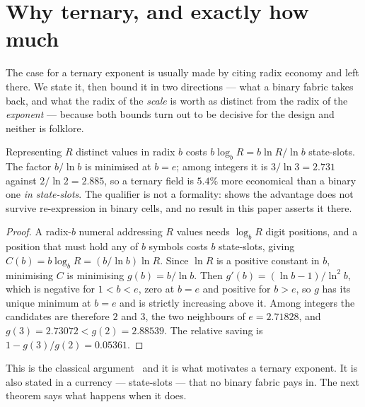 \section{Why ternary, and exactly how much}\label{sec:whyternary}



The case for a ternary exponent is usually made by citing radix economy and left
there. We state it, then bound it in two directions --- what a binary fabric takes
back, and what the radix of the \emph{scale} is worth as distinct from the radix
of the \emph{exponent} --- because both bounds turn out to be decisive for the
design and neither is folklore.

\begin{theorem}
\label{thm:economy}
Representing $R$ distinct values in radix $b$ costs $b\log_b R = b\ln R/\ln b$
state-slots. The factor $b/\ln b$ is minimised at $b = e$; among integers it is
$3/\ln 3 = 2.731$ against $2/\ln 2 = 2.885$, so a ternary field is $5.4\%$ more
economical than a binary one \emph{in state-slots}. The qualifier is not a
formality:  shows the advantage does not survive
re-expression in binary cells, and no result in this paper asserts it there.
\end{theorem}

\begin{proof}
A radix-$b$ numeral addressing $R$ values needs $\log_b R$ digit positions, and a
position that must hold any of $b$ symbols costs $b$ state-slots, giving
$C(b) = b\log_b R = (b/\ln b)\ln R$. Since $\ln R$ is a positive constant in $b$,
minimising $C$ is minimising $g(b) = b/\ln b$. Then
$g'(b) = (\ln b - 1)/\ln^{2} b$, which is negative for $1 < b < e$, zero at
$b = e$ and positive for $b > e$, so $g$ has its unique minimum at $b = e$ and is
strictly increasing above it. Among integers the candidates are therefore $2$ and
$3$, the two neighbours of $e = 2.71828$, and $g(3) = 2.73072 < g(2) = 2.88539$.
The relative saving is $1 - g(3)/g(2) = 0.05361$.
\end{proof}

This is the classical argument~\cite{hayes2001,radixeconomy} and it is what
motivates a ternary exponent. It is also stated in a currency --- state-slots ---
that no binary fabric pays in. The next theorem says what happens when it does.

